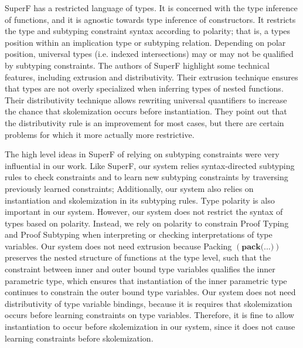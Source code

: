 \documentclass[acmsmall]{acmart}
\theoremstyle{definition}
\begin{document}
SuperF has a restricted language of types. It is concerned with the type inference
of functions, and it is agnostic towards type inference of constructors. 
It restricts the type and subtyping constraint syntax according to polarity; that is, a
types position within an implication type or subtyping relation. Depending on polar position,
universal types (i.e. indexed intersections) may or may not be qualified by subtyping constraints.
The authors of SuperF highlight some technical features, including extrusion and distributivity.
Their extrusion technique ensures that types are not overly specialized
when inferring types of nested functions. Their distributivity technique allows
rewriting universal quantifiers to increase the chance that skolemization occurs before instantiation. 
They point out that the distributivity rule is an improvement for most cases, but there are certain
problems for which it more actually more restrictive.


The high level ideas in SuperF of relying on subtyping constraints were very influential in our work.
Like SuperF, our system relies syntax-directed subtyping rules to check constraints and to learn 
new subtyping constraints by traversing previously learned constraints;
Additionally, our system also relies on instantiation and skolemization in its subtyping rules. 
Type polarity is also important in our system.
However, our system does not restrict the syntax of types based on polarity. Instead, we rely on
polarity to constrain Proof Typing and Proof Subtyping when interpreting or checking interpretations
of type variables.    
Our system does not need extrusion because Packing $(\textbf{pack(...)})$ preserves the nested structure of 
functions at the type level, such that the constraint between inner and outer bound type variables
qualifies the inner parametric type, which ensures that instantiation of the inner parametric type 
continues to constrain the outer bound type variables.  
Our system does not need distributivity of type variable bindings, because it is requires
that skolemization occurs before learning constraints on type variables. Therefore, it is fine to allow
instantiation to occur before skolemization in our system, 
since it does not cause learning constraints before skolemization.  


\end{document}

